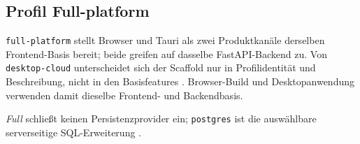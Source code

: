 \subsection{Profil Full-platform}
\label{subsec:profil-full-platform}

\texttt{full-platform} stellt Browser und Tauri als zwei Produktkanäle
derselben Frontend-Basis bereit; beide greifen auf dasselbe FastAPI-Backend zu.
Von \texttt{desktop-\allowbreak cloud} unterscheidet sich der Scaffold nur in
Profilidentität und Beschreibung, nicht in den Basisfeatures
\parencite{kleiveist2026profiles,kleiveist2026governance-snapshot}.
Browser-Build und Desktopanwendung verwenden damit dieselbe Frontend- und
Backendbasis.

\emph{Full} schließt keinen Persistenzprovider ein; \texttt{postgres} ist die
auswählbare serverseitige SQL-Erweiterung
\parencite{kleiveist2026persistence}.
